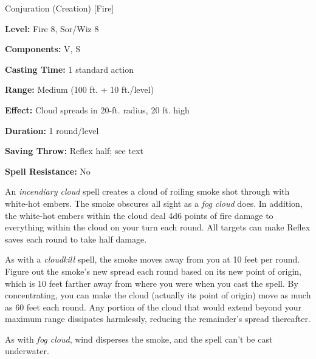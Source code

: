 
Conjuration (Creation) [Fire]

\textbf{Level:} Fire 8, Sor/Wiz 8

\textbf{Components:} V, S

\textbf{Casting Time:} 1 standard action

\textbf{Range:} Medium (100 ft. + 10 ft./level)

\textbf{Effect:} Cloud spreads in 20-ft. radius, 20 ft. high

\textbf{Duration:} 1 round/level

\textbf{Saving Throw:} Reflex half; see text

\textbf{Spell Resistance:} No

An \textit{incendiary cloud} spell creates a cloud of roiling smoke shot through 
with white-hot embers. The smoke obscures all sight as a \textit{fog cloud} does. 
In addition, the white-hot embers within the cloud deal 4d6 points of fire damage 
to everything within the cloud on your turn each round. All targets can make Reflex 
saves each round to take half damage.

As with a \textit{cloudkill} spell, the smoke moves away from you at 10 feet per 
round. Figure out the smoke's new spread each round based on its new point of origin, 
which is 10 feet farther away from where you were when you cast the spell. By concentrating, 
you can make the cloud (actually its point of origin) move as much as 60 feet each 
round. Any portion of the cloud that would extend beyond your maximum range dissipates 
harmlessly, reducing the remainder's spread thereafter.

As with \textit{fog cloud}, wind disperses the smoke, and the spell can't be cast 
underwater.

